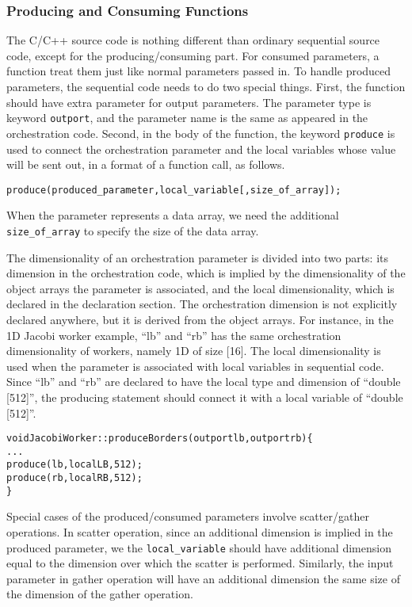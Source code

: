 \documentclass[10pt]{article}
\def\code#1{{\small {\tt {#1}}}}
\begin{document}
\subsubsection{Producing and Consuming Functions}
The C/C++ source code is nothing different than ordinary sequential source code,
except for the producing/consuming part. For consumed parameters, a function
treat them just like normal parameters passed in. To handle produced parameters, 
the sequential code needs to do two special things. First, the function should 
have extra parameter for output parameters. The parameter type is keyword \code{outport},
and the parameter name is the same as appeared in the orchestration code. Second,
in the body of the function, the keyword \code{produce} is used to connect the 
orchestration parameter and the local variables whose value will be sent out, in 
a format of a function call, as follows.

\begin{alltt}
    produce(produced\_parameter, local\_variable[, size\_of\_array]);
\end{alltt}

When the parameter represents a data array, we need the additional
\code{size\_of\_array} to specify the size of the data array. 

The dimensionality of an orchestration parameter is divided into two parts: 
its dimension in the orchestration code, which is implied by the dimensionality
of the object arrays the parameter is associated, and the local dimensionality,
which is declared in the declaration section. The orchestration dimension is not
explicitly declared anywhere, but it is derived from the object arrays. For 
instance, in the 1D Jacobi worker example, ``lb'' and ``rb'' has the same 
orchestration dimensionality of workers, namely 1D of size [16]. The local
dimensionality is used when the parameter is associated with local variables 
in sequential code. Since ``lb'' and ``rb'' are declared to have the local
type and dimension of ``double [512]'', the producing statement should connect
it with a local variable of ``double [512]''.

\begin{alltt}
    void JacobiWorker::produceBorders(outport lb, outport rb)\{
      . . .
      produce(lb,localLB,512);
      produce(rb,localRB,512);
    \}
\end{alltt}

Special cases of the produced/consumed parameters involve scatter/gather
operations. In scatter operation, since an additional dimension is implied in
the produced parameter, we the \code{local\_variable} should have additional
dimension equal to the dimension over which the scatter is performed. Similarly,
the input parameter in gather operation will have an additional dimension the
same size of the dimension of the gather operation.
\end{document}
